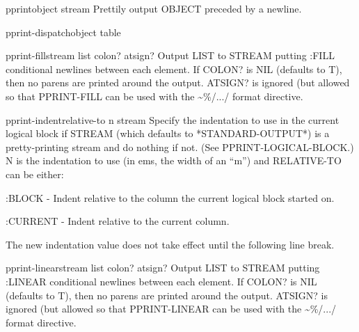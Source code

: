 \begin{function}{pprint}{object \op stream}
  Prettily output OBJECT preceded by a newline.
\end{function}

\begin{function}{pprint-dispatch}{object \op table}
  
\end{function}

\begin{function}{pprint-fill}{stream list \op colon? atsign?}
  Output LIST to STREAM putting :FILL conditional newlines between each
   element. If COLON? is NIL (defaults to T), then no parens are printed
   around the output. ATSIGN? is ignored (but allowed so that PPRINT-FILL
   can be used with the \~{}\%/.../ format directive.
\end{function}

\begin{function}{pprint-indent}{relative-to n \op stream}
  Specify the indentation to use in the current logical block if
STREAM (which defaults to *STANDARD-OUTPUT*) is a pretty-printing
stream and do nothing if not. (See PPRINT-LOGICAL-BLOCK.) N is the
indentation to use (in ems, the width of an ``m'') and RELATIVE-TO can
be either:

     :BLOCK - Indent relative to the column the current logical block
        started on.

     :CURRENT - Indent relative to the current column.

The new indentation value does not take effect until the following
line break.
\end{function}

\begin{function}{pprint-linear}{stream list \op colon? atsign?}
  Output LIST to STREAM putting :LINEAR conditional newlines between each
   element. If COLON? is NIL (defaults to T), then no parens are printed
   around the output. ATSIGN? is ignored (but allowed so that PPRINT-LINEAR
   can be used with the \~{}\%/.../ format directive.
\end{function}

